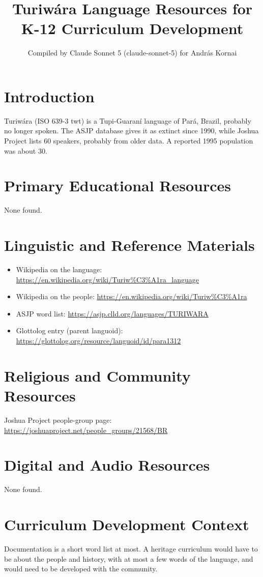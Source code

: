 \documentclass[12pt]{article}
\title{Turiw\'ara Language Resources for K-12 Curriculum Development}
\author{Compiled by Claude Sonnet 5 (claude-sonnet-5) for Andr\'as Kornai}
\date{}
\begin{document}
\maketitle
\section{Introduction}
Turiw\'ara (ISO 639-3 twt) is a Tupi-Guaran\'i language of Par\'a, Brazil, probably no longer spoken. The ASJP database gives it as extinct since 1990, while Joshua Project lists 60 speakers, probably from older data. A reported 1995 population was about 30.
\section{Primary Educational Resources}
None found.
\section{Linguistic and Reference Materials}
\begin{itemize}
\item Wikipedia on the language: \url{https://en.wikipedia.org/wiki/Turiw%C3%A1ra_language}
\item Wikipedia on the people: \url{https://en.wikipedia.org/wiki/Turiw%C3%A1ra}
\item ASJP word list: \url{https://asjp.clld.org/languages/TURIWARA}
\item Glottolog entry (parent languoid): \url{https://glottolog.org/resource/languoid/id/para1312}
\end{itemize}
\section{Religious and Community Resources}
Joshua Project people-group page: \url{https://joshuaproject.net/people_groups/21568/BR}
\section{Digital and Audio Resources}
None found.
\section{Curriculum Development Context}
Documentation is a short word list at most. A heritage curriculum would have to be about the people and history, with at most a few words of the language, and would need to be developed with the community.
\end{document}
